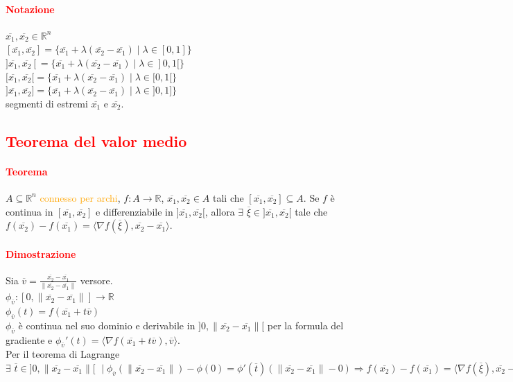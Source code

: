 \documentclass{article}
\newcommand{\R}{\mathbb{R}}
\begin{document}
\paragraph{\textcolor{red}{Notazione}}
$\overline{x_1},\overline{x_2}\in\R^n$\\
$[\overline{x_1},\overline{x_2}]=\{\overline{x_1}+\lambda(\overline{x_2}-\overline{x_1})\mid\lambda\in[0,1]\}$\\
$]\overline{x_1},\overline{x_2}[=\{\overline{x_1}+\lambda(\overline{x_2}-\overline{x_1})\mid\lambda\in]0,1[\}$\\
$[\overline{x_1},\overline{x_2}[=\{\overline{x_1}+\lambda(\overline{x_2}-\overline{x_1})\mid\lambda\in[0,1[\}$\\
$]\overline{x_1},\overline{x_2}]=\{\overline{x_1}+\lambda(\overline{x_2}-\overline{x_1})\mid\lambda\in]0,1]\}$\\
segmenti di estremi $\overline{x_1}$ e $\overline{x_2}$.

\subsection{\textcolor{red}{Teorema del valor medio}}
\paragraph{\textcolor{red}{Teorema}}
$A \subseteq \R^n$ \textcolor{orange}{connesso per archi}, $f:A\rightarrow \R$, $\overline{x_1},\overline{x_2}\in A$ tali che $[\overline{x_1},\overline{x_2}]\subseteq A$. Se $f$ è continua in $[\overline{x_1},\overline{x_2}]$ e differenziabile in $]\overline{x_1},\overline{x_2}[$, allora $\exists\,\, \overline{\xi} \in]\overline{x_1},\overline{x_2}[$ tale che $f(\overline{x_2})-f(\overline{x_1})=\langle \nabla f(\overline{\xi}),\overline{x_2}-\overline{x_1} \rangle$.

\paragraph{\textcolor{red}{Dimostrazione}}
Sia $\overline{v}=\frac{\overline{x_2}-\overline{x_1}}{\|\overline{x_2}-\overline{x_1}\|}$ versore.\\
$\phi_{\overline{v}}:[0,\|\overline{x_2}-\overline{x_1}\|]\rightarrow\R$\\
$\phi_{\overline{v}}(t)=f(\overline{x_1}+t\overline{v})$\\
$\phi_{\overline{v}}$ è continua nel suo dominio e derivabile in $]0,\| \overline{x_2}-\overline{x_1} \|[$ per la formula del gradiente e $\phi_{\overline{v}}'(t)=\langle\nabla f(\overline{x_1}+t\overline{v}),\overline{v}\rangle$. \\
Per il teorema di Lagrange $\exists\,\, \overline{t}\in]0,\|\overline{x_2}-\overline{x_1}\|[\,\, \mid \phi_{\overline{v}}(\|\overline{x_2}-\overline{x_1}\|)-\phi(0)=\phi'(\overline{t})(\|\overline{x_2}-\overline{x_1}\|-0)\Rightarrow f(\overline{x_2})-f(\overline{x_1})=\langle\nabla f(\overline{\xi}),\overline{x_2}-\overline{x_1}\rangle$
\begin{flushright}
    \Lightning
\end{flushright}
\end{document}
